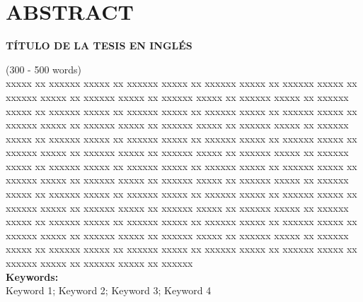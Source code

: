 \chapter*{\center \Large \vspace{-4.5cm} ABSTRACT}

\begin{center}
\Large \vspace{-1.5cm} \textbf{TÍTULO DE LA TESIS EN INGLÉS}
\end{center}

\noindent
(300 - 500 words)\\
xxxxx xx xxxxxx xxxxx xx xxxxxx xxxxx xx xxxxxx xxxxx xx xxxxxx xxxxx xx xxxxxx xxxxx xx xxxxxx xxxxx xx xxxxxx xxxxx xx xxxxxx xxxxx xx xxxxxx xxxxx xx xxxxxx xxxxx xx xxxxxx xxxxx xx xxxxxx xxxxx xx xxxxxx xxxxx xx xxxxxx xxxxx xx xxxxxx xxxxx xx xxxxxx xxxxx xx xxxxxx xxxxx xx xxxxxx xxxxx xx xxxxxx xxxxx xx xxxxxx xxxxx xx xxxxxx xxxxx xx xxxxxx xxxxx xx xxxxxx xxxxx xx xxxxxx xxxxx xx xxxxxx xxxxx xx xxxxxx xxxxx xx xxxxxx xxxxx xx xxxxxx xxxxx xx xxxxxx xxxxx xx xxxxxx xxxxx xx xxxxxx xxxxx xx xxxxxx xxxxx xx xxxxxx xxxxx xx xxxxxx xxxxx xx xxxxxx xxxxx xx xxxxxx xxxxx xx xxxxxx xxxxx xx xxxxxx xxxxx xx xxxxxx xxxxx xx xxxxxx xxxxx xx xxxxxx xxxxx xx xxxxxx xxxxx xx xxxxxx xxxxx xx xxxxxx xxxxx xx xxxxxx xxxxx xx xxxxxx xxxxx xx xxxxxx xxxxx xx xxxxxx xxxxx xx xxxxxx xxxxx xx xxxxxx xxxxx xx xxxxxx xxxxx xx xxxxxx xxxxx xx xxxxxx xxxxx xx xxxxxx xxxxx xx xxxxxx xxxxx xx xxxxxx xxxxx xx xxxxxx xxxxx xx xxxxxx xxxxx xx xxxxxx xxxxx xx xxxxxx xxxxx xx xxxxxx  \\


\noindent \textbf{Keywords:}\\
\noindent Keyword 1; Keyword 2; Keyword 3; Keyword 4


